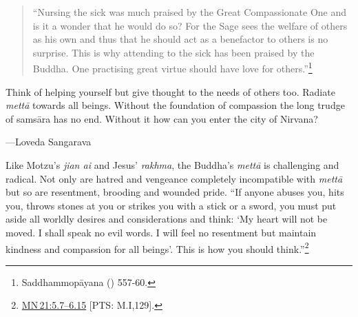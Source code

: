 \documentclass[10pt, openright]{book}
\newenvironment{epigram-2}%
{%
\setstretch{1.4}
\vspace{1em}
\noindent
\quoting[leftmargin=2cm,rightmargin=2cm]%
\begin{itshape}
\large
}%
{\end{itshape}\endquoting
}%
\newenvironment{epigram-2-cite}%
{%
\quoting[leftmargin=2cm,rightmargin=2cm]%
\noindent\normal\hspace*{\fill} 
}%
{\endquoting
}%
\begin{document}
\begin{quote}

\hspace{-0.4em}“Nursing the sick was much praised by the Great Compassionate One and is it a wonder that he would do so? For the Sage sees the welfare of others as his own and thus that he should act as a benefactor to others is no surprise. This is why attending to the sick has been praised by the Buddha. One practising great virtue should have love for others.”\footnote {Saddhammopāyana (\cite{Hazlewood 1988a}) 557-60.}


\end{quote}
\begin{epigram-2}
Think of helping yourself but give thought to the needs of others too. Radiate \textit{mettā} towards all beings. Without the foundation of compassion the long trudge of samsāra has no end. Without it how can you enter the city of Nirvana?
\end{epigram-2}
\begin{epigram-2-cite}
—Loveda Sangarava
\end{epigram-2-cite}

Like Motzu’s \textit{jian ai} and Jesus’ \textit{rakhma}, the Buddha’s \textit{mettā} is challenging and radical. Not only are hatred and vengeance completely incompatible with \textit{mettā} but so are resentment, brooding and wounded pride. “If anyone abuses you, hits you, throws stones at you or strikes you with a stick or a sword, you must put aside all worldly desires and considerations and think: ‘My heart will not be moved. I shall speak no evil words. I will feel no resentment but maintain kindness and compassion for all beings’. This is how you should think.”\footnote {\href{https://suttacentral.net/mn21/en/sujato\#5.7}{MN 21:5.7–6.15} [PTS: M.I,129].}
\end{document}
